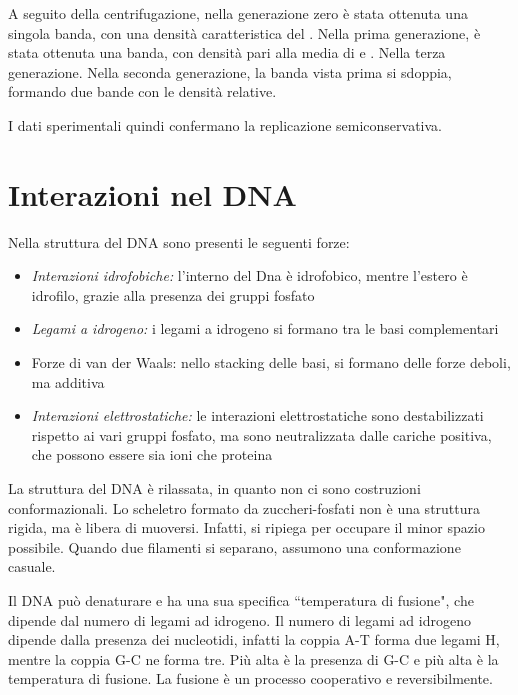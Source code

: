 
A seguito della centrifugazione, nella generazione zero è stata ottenuta una singola banda, con una densità caratteristica del . Nella prima generazione, è stata ottenuta una banda, con densità pari alla media di  e . Nella terza generazione. Nella seconda generazione, la banda vista prima si sdoppia, formando due bande con le densità relative.


I dati sperimentali quindi confermano la replicazione semiconservativa.

\section{Interazioni nel DNA}

Nella struttura del DNA sono presenti le seguenti forze:
\begin{itemize}
\item \emph{Interazioni idrofobiche:} l'interno del Dna è idrofobico, mentre l'estero è idrofilo, grazie alla presenza dei gruppi fosfato
\item \emph{Legami a idrogeno:} i legami a idrogeno si formano tra le basi complementari
\item Forze di van der Waals: nello stacking delle basi, si formano delle forze deboli, ma additiva
\item  \emph{Interazioni elettrostatiche:} le interazioni elettrostatiche sono destabilizzati rispetto ai vari gruppi fosfato, ma sono neutralizzata dalle cariche positiva, che possono essere sia ioni che proteina
\end{itemize}

La struttura del DNA è rilassata, in quanto non ci sono costruzioni conformazionali. Lo scheletro formato da zuccheri-fosfati non è una struttura rigida, ma è libera di muoversi. Infatti, si ripiega per occupare il minor spazio possibile. Quando due filamenti si separano, assumono una conformazione casuale.



Il DNA può denaturare e ha una sua specifica ``temperatura di fusione", che dipende dal numero di legami ad idrogeno. Il numero di legami ad idrogeno dipende dalla presenza dei nucleotidi, infatti la coppia A-T forma due legami H, mentre la coppia G-C ne forma tre. Più alta è la presenza di G-C e più alta è la temperatura di fusione.
La fusione è un processo cooperativo e reversibilmente.

